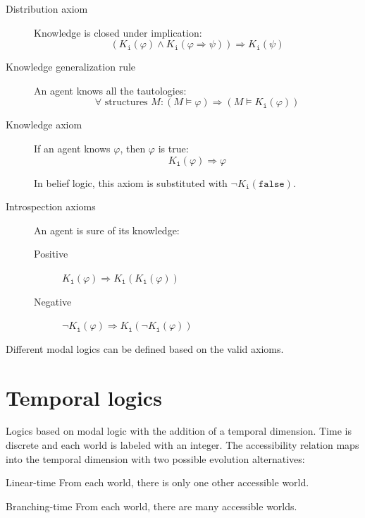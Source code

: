 \begin{description}
\begin{description}
            \item[Distribution axiom] 
                Knowledge is closed under implication:
                \[ (K_\texttt{i}(\varphi) \land K_\texttt{i}(\varphi \Rightarrow \psi)) \Rightarrow K_\texttt{i}(\psi) \]

            \item[Knowledge generalization rule] 
                An agent knows all the tautologies:
                \[ \forall \text{ structures } M: (M \models \varphi) \Rightarrow (M \models K_\texttt{i}(\varphi)) \]

            \item[Knowledge axiom] 
                If an agent knows $\varphi$, then $\varphi$ is true:
                \[ K_\texttt{i}(\varphi) \Rightarrow \varphi \]

                In belief logic, this axiom is substituted with $\lnot K_\texttt{i}(\texttt{false})$.

            \item[Introspection axioms]
                An agent is sure of its knowledge:
                \begin{description}
                    \item[Positive] $K_\texttt{i}(\varphi) \Rightarrow K_\texttt{i}(K_\texttt{i}(\varphi))$ 
                    \item[Negative] $\lnot K_\texttt{i}(\varphi) \Rightarrow K_\texttt{i}(\lnot K_\texttt{i}(\varphi))$ 
                \end{description}
        \end{description}
        
        Different modal logics can be defined based on the valid axioms.
\end{description}



\section{Temporal logics}

Logics based on modal logic with the addition of a temporal dimension.
Time is discrete and each world is labeled with an integer. 
The accessibility relation maps into the temporal dimension with two possible evolution alternatives:
\begin{descriptionlist}
    \item[Linear-time] 
        From each world, there is only one other accessible world.
    
    \item[Branching-time] 
        From each world, there are many accessible worlds.
\end{descriptionlist}





